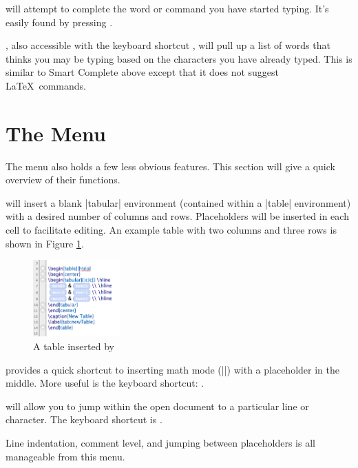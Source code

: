  will attempt to complete the word or command you have started typing. It's easily found by pressing \keys{\esckey}.

, also accessible with the keyboard shortcut , will pull up a list of words that \texnicle thinks you may be typing based on the characters you have already typed. This is similar to Smart Complete above except that it does not suggest \LaTeX\ commands.

\section[The Editor Menu]{The  Menu}
\label{reference.editortable}
The  menu also holds a few less obvious \texnicle features. This section will give a quick overview of their functions.

 will insert a blank |tabular| environment (contained within a |table| environment) with a desired number of columns and rows. Placeholders will be inserted in each cell to facilitate editing. An example table with two columns and three rows is shown in Figure \ref{fig:texnicle-inserttable}.

\begin{figure}[htbp]
\centering
\includegraphics[width=0.3\textwidth]{TeXnicle-Images/texnicle-inserttable.png}
\caption{A table inserted by \texnicle}
\label{fig:texnicle-inserttable}
\end{figure}

 provides a quick shortcut to inserting math mode (|$ $|) with a placeholder in the middle. More useful is the keyboard shortcut: .

 will allow you to jump within the open document to a particular line or character. The keyboard shortcut is .

Line indentation, comment level, and jumping between placeholders is all manageable from this menu.

